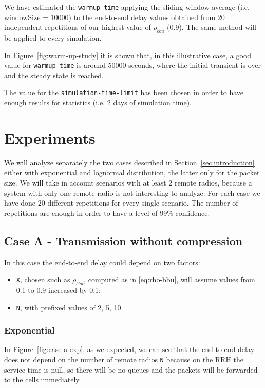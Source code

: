\documentclass[11pt,a4paper,oneside, openright]{article}
\begin{document}
We have estimated the \texttt{warmup-time} applying the sliding window average (i.e. windowSize = 10000) to the end-to-end delay values obtained from 20 independent repetitions of our highest value of $ \rho_{bbu} $ (0.9). The same method will be applied to every simulation.

In Figure~\ref{fig:warm-up-study} it is shown that, in this illustrative case, a good value for \texttt{warmup-time} is around 50000 seconds, where the initial transient is over and the steady state is reached. 

The value for the \texttt{simulation-time-limit} has been chosen in order to have enough results for statistics (i.e. 2 days of simulation time).

\section{Experiments}
We will analyze separately the two cases described in Section~\ref{sec:introduction} either with exponential and lognormal distribution, the latter only for the packet size.
We will take in account scenarios with at least 2 remote radios, because a system with only one remote radio is not interesting to analyze. For each case we have done 20 different repetitions for every single scenario.
The number of repetitions are enough in order to have a level of 99\% confidence. 

\subsection{Case A - Transmission without compression}
In this case the end-to-end delay could depend on two factors:
\begin{itemize}
	\item \texttt{X}, chosen such as $ \rho_{bbu} $, computed as in \ref{eq:rho-bbu}, will assume values from 0.1 to 0.9 increased by 0.1;
	\item \texttt{N}, with prefixed values of 2, 5, 10.
\end{itemize}

\subsubsection{Exponential}
In Figure~\ref{fig:case-a-exp}, as we expected, we can see that the end-to-end delay does not depend on the number of remote radios \texttt{N} because on the RRH the service time is null, so there will be no queues and the packets will be forwarded to the cells immediately.
\end{document}
